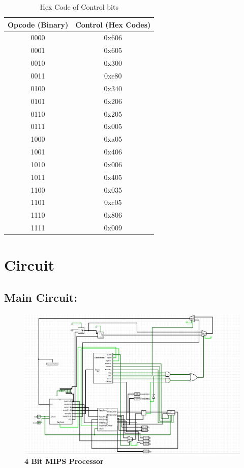 \documentclass[12]{article}
\begin{document}
\begin{table}[!h]
    \centering
    \begin{tabular}{|c|c|}
        \hline
        \textbf{Opcode (Binary)} & \textbf{Control (Hex Codes)} \\
        \hline
        0000 & 0x606 \\ \hline
        0001 & 0x605 \\ \hline
        0010 & 0x300 \\ \hline
        0011 & 0xe80 \\ \hline
        0100 & 0x340 \\ \hline
        0101 & 0x206 \\ \hline
        0110 & 0x205 \\ \hline
        0111 & 0x005 \\ \hline
        1000 & 0xa05 \\ \hline
        1001 & 0x406 \\ \hline
        1010 & 0x006 \\ \hline
        1011 & 0x405 \\ \hline
        1100 & 0x035 \\ \hline
        1101 & 0xc05 \\ \hline
        1110 & 0x806 \\ \hline
        1111 & 0x009 \\ \hline
    \end{tabular}
    \caption{Hex Code of Control bits}
    \label{tab:2}
\end{table}

\newpage

\section{Circuit}
\subsection{Main Circuit:}
    
    \begin{figure}[!h]
        \includegraphics[scale = 0.5]{Images/Main circuit.png}
        \caption{\textbf{4 Bit MIPS Processor}}
    \end{figure}
\end{document}
